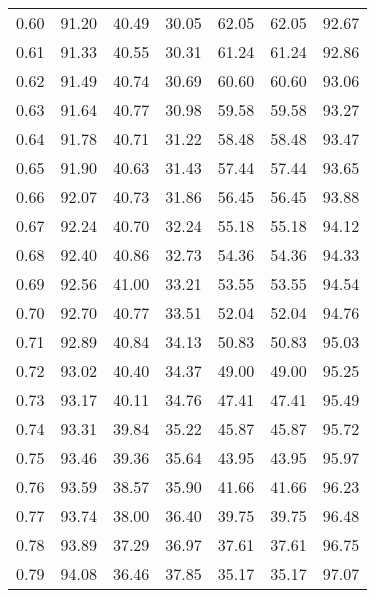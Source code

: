 \begin{tabular}{|c|c|c|c|c|c|c|}
      0.60 &     91.20 &     40.49 &      30.05 &   62.05 &      62.05 &         92.67 \\
      0.61 &     91.33 &     40.55 &      30.31 &   61.24 &      61.24 &         92.86 \\
      0.62 &     91.49 &     40.74 &      30.69 &   60.60 &      60.60 &         93.06 \\
      0.63 &     91.64 &     40.77 &      30.98 &   59.58 &      59.58 &         93.27 \\
      0.64 &     91.78 &     40.71 &      31.22 &   58.48 &      58.48 &         93.47 \\
      0.65 &     91.90 &     40.63 &      31.43 &   57.44 &      57.44 &         93.65 \\
      0.66 &     92.07 &     40.73 &      31.86 &   56.45 &      56.45 &         93.88 \\
      0.67 &     92.24 &     40.70 &      32.24 &   55.18 &      55.18 &         94.12 \\
      0.68 &     92.40 &     40.86 &      32.73 &   54.36 &      54.36 &         94.33 \\
      0.69 &     92.56 &     41.00 &      33.21 &   53.55 &      53.55 &         94.54 \\
      0.70 &     92.70 &     40.77 &      33.51 &   52.04 &      52.04 &         94.76 \\
      0.71 &     92.89 &     40.84 &      34.13 &   50.83 &      50.83 &         95.03 \\
      0.72 &     93.02 &     40.40 &      34.37 &   49.00 &      49.00 &         95.25 \\
      0.73 &     93.17 &     40.11 &      34.76 &   47.41 &      47.41 &         95.49 \\
      0.74 &     93.31 &     39.84 &      35.22 &   45.87 &      45.87 &         95.72 \\
      0.75 &     93.46 &     39.36 &      35.64 &   43.95 &      43.95 &         95.97 \\
      0.76 &     93.59 &     38.57 &      35.90 &   41.66 &      41.66 &         96.23 \\
      0.77 &     93.74 &     38.00 &      36.40 &   39.75 &      39.75 &         96.48 \\
      0.78 &     93.89 &     37.29 &      36.97 &   37.61 &      37.61 &         96.75 \\
      0.79 &     94.08 &     36.46 &      37.85 &   35.17 &      35.17 &         97.07 \\

\end{tabular}
